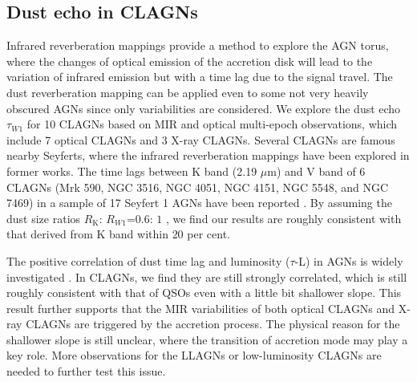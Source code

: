 \documentclass[linenumbers]{aastex631}
\begin{document}
\subsection{Dust echo in CLAGNs}

Infrared reverberation mappings provide a method to explore the AGN torus, where the changes of optical emission of the accretion disk will lead to the variation of infrared emission but with a time lag due to the signal travel. The dust reverberation mapping can be applied even to some not very heavily obscured AGNs since only variabilities are considered. We explore the dust echo $\tau_{W1}$ for 10 CLAGNs based on MIR and optical multi-epoch observations, which include 7 optical CLAGNs and 3 X-ray CLAGNs. Several CLAGNs are famous nearby Seyferts, where the infrared reverberation mappings have been explored in former works. The time lags between K band (2.19 $\mu$m) and V band of 6 CLAGNs (Mrk 590, NGC 3516, NGC 4051, NGC 4151, NGC 5548, and NGC 7469) in a sample of 17 Seyfert 1 AGNs have been reported \citep[see][]{2014ApJ...788..159K,2019ApJ...886...33L}. {\color{red}By assuming the dust size ratios $R_\mathrm{K}$: $R_{W1}$=$0.6$: $1$ \citep[see][]{2019ApJ...886...33L}, we find our results are roughly consistent with that derived from K band within $20$ per cent.}

The positive correlation of dust time lag and luminosity ($\tau$-L) in AGNs is widely investigated \citep[e.g.,][]{2014ApJ...788..159K,2019ApJ...886...33L,2020MNRAS.495.2921N,2021MNRAS.501.3905M}. In CLAGNs, we find they are still strongly correlated, which is still roughly consistent with that of QSOs \citep[][]{2019ApJ...886...33L} even with a little bit shallower slope. This result further supports that the MIR variabilities of both optical CLAGNs and X-ray CLAGNs are triggered by the accretion process. The physical reason for the shallower slope is still unclear, where the transition of accretion mode may play a key role. More observations for the LLAGNs or low-luminosity CLAGNs are needed to further test this issue.  


\end{document}
